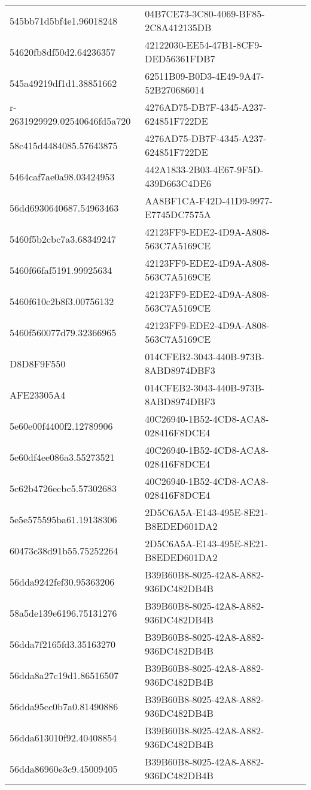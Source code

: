 \begin{tabular}{ll}
545bb71d5bf4e1.96018248 & 04B7CE73-3C80-4069-BF85-2C8A412135DB \\
54620fb8df50d2.64236357 & 42122030-EE54-47B1-8CF9-DED56361FDB7 \\
545a49219df1d1.38851662 & 62511B09-B0D3-4E49-9A47-52B270686014 \\
r-2631929929.02540646fd5a720 & 4276AD75-DB7F-4345-A237-624851F722DE \\
58c415d4484085.57643875 & 4276AD75-DB7F-4345-A237-624851F722DE \\
5464caf7ae0a98.03424953 & 442A1833-2B03-4E67-9F5D-439D663C4DE6 \\
56dd6930640687.54963463 & AA8BF1CA-F42D-41D9-9977-E7745DC7575A \\
5460f5b2cbc7a3.68349247 & 42123FF9-EDE2-4D9A-A808-563C7A5169CE \\
5460f66faf5191.99925634 & 42123FF9-EDE2-4D9A-A808-563C7A5169CE \\
5460f610c2b8f3.00756132 & 42123FF9-EDE2-4D9A-A808-563C7A5169CE \\
5460f560077d79.32366965 & 42123FF9-EDE2-4D9A-A808-563C7A5169CE \\
D8D8F9F550 & 014CFEB2-3043-440B-973B-8ABD8974DBF3 \\
AFE23305A4 & 014CFEB2-3043-440B-973B-8ABD8974DBF3 \\
5e60e00f4400f2.12789906 & 40C26940-1B52-4CD8-ACA8-028416F8DCE4 \\
5e60df4ee086a3.55273521 & 40C26940-1B52-4CD8-ACA8-028416F8DCE4 \\
5c62b4726ecbc5.57302683 & 40C26940-1B52-4CD8-ACA8-028416F8DCE4 \\
5e5e575595ba61.19138306 & 2D5C6A5A-E143-495E-8E21-B8EDED601DA2 \\
60473c38d91b55.75252264 & 2D5C6A5A-E143-495E-8E21-B8EDED601DA2 \\
56dda9242fef30.95363206 & B39B60B8-8025-42A8-A882-936DC482DB4B \\
58a5de139e6196.75131276 & B39B60B8-8025-42A8-A882-936DC482DB4B \\
56dda7f2165fd3.35163270 & B39B60B8-8025-42A8-A882-936DC482DB4B \\
56dda8a27c19d1.86516507 & B39B60B8-8025-42A8-A882-936DC482DB4B \\
56dda95cc0b7a0.81490886 & B39B60B8-8025-42A8-A882-936DC482DB4B \\
56dda613010f92.40408854 & B39B60B8-8025-42A8-A882-936DC482DB4B \\
56dda86960e3c9.45009405 & B39B60B8-8025-42A8-A882-936DC482DB4B \\

\end{tabular}
